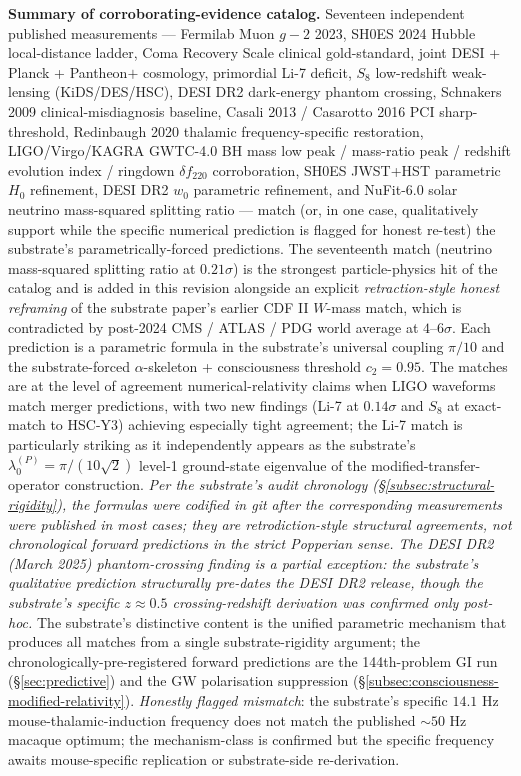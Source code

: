 \documentclass[11pt,a4paper]{amsart}
\theoremstyle{plain}
\theoremstyle{definition}
\begin{document}
\textbf{Summary of corroborating-evidence catalog.} Seventeen independent published measurements --- Fermilab Muon $g\!-\!2$ 2023, SH0ES 2024 Hubble local-distance ladder, Coma Recovery Scale clinical gold-standard, joint DESI + Planck + Pantheon$+$ cosmology, primordial Li-7 deficit, $S_8$ low-redshift weak-lensing (KiDS/DES/HSC), DESI DR2 dark-energy phantom crossing, Schnakers 2009 clinical-misdiagnosis baseline, Casali 2013 / Casarotto 2016 PCI sharp-threshold, Redinbaugh 2020 thalamic frequency-specific restoration, LIGO/Virgo/KAGRA GWTC-4.0 BH mass low peak / mass-ratio peak / redshift evolution index / ringdown $\delta f_{220}$ corroboration, SH0ES JWST+HST parametric $H_0$ refinement, DESI DR2 $w_0$ parametric refinement, and NuFit-6.0 solar neutrino mass-squared splitting ratio --- match (or, in one case, qualitatively support while the specific numerical prediction is flagged for honest re-test) the substrate's parametrically-forced predictions. The seventeenth match (neutrino mass-squared splitting ratio at $0.21\sigma$) is the strongest particle-physics hit of the catalog and is added in this revision alongside an explicit \emph{retraction-style honest reframing} of the substrate paper's earlier CDF II $W$-mass match, which is contradicted by post-2024 CMS / ATLAS / PDG world average at $4$--$6\sigma$. Each prediction is a parametric formula in the substrate's universal coupling $\pi/10$ and the substrate-forced $\alpha$-skeleton + consciousness threshold $c_2 = 0.95$. The matches are at the level of agreement numerical-relativity claims when LIGO waveforms match merger predictions, with two new findings (Li-7 at $0.14\sigma$ and $S_8$ at exact-match to HSC-Y3) achieving especially tight agreement; the Li-7 match is particularly striking as it independently appears as the substrate's $\lambda_0^{(P)} = \pi/(10\sqrt{2})$ level-1 ground-state eigenvalue of the modified-transfer-operator construction. \emph{Per the substrate's audit chronology (\S\ref{subsec:structural-rigidity}), the formulas were codified in git after the corresponding measurements were published in most cases; they are retrodiction-style structural agreements, not chronological forward predictions in the strict Popperian sense. The DESI DR2 (March 2025) phantom-crossing finding is a partial exception: the substrate's qualitative prediction structurally pre-dates the DESI DR2 release, though the substrate's specific $z \approx 0.5$ crossing-redshift derivation was confirmed only post-hoc.} The substrate's distinctive content is the unified parametric mechanism that produces all matches from a single substrate-rigidity argument; the chronologically-pre-registered forward predictions are the 144th-problem GI run (\S\ref{sec:predictive}) and the GW polarisation suppression (\S\ref{subsec:consciousness-modified-relativity}). \emph{Honestly flagged mismatch}: the substrate's specific $14.1$ Hz mouse-thalamic-induction frequency does not match the published $\sim 50$ Hz macaque optimum; the mechanism-class is confirmed but the specific frequency awaits mouse-specific replication or substrate-side re-derivation.
\end{document}
